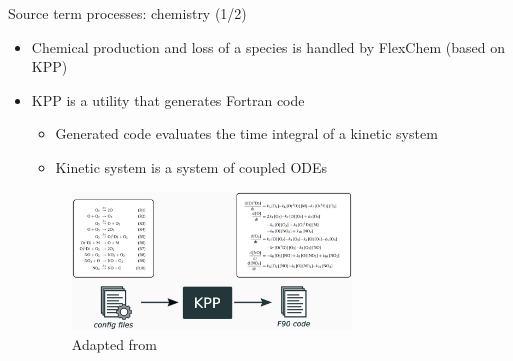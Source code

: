 \documentclass[10pt]{beamer}
\begin{document}
\begin{frame}[fragile]{Source term processes: chemistry (1/2)}
    \begin{itemize}
        \item Chemical production and loss of a species is handled by FlexChem (based on KPP)
        \item KPP is a utility that generates Fortran code 
        \begin{itemize}
            \item Generated code evaluates the time integral of a kinetic system
            \item Kinetic system is a system of coupled ODEs
        \end{itemize}
        \vfill
        \begin{figure}
            \centering
            \includegraphics[width=0.7\textwidth]{kpp.eps}
            \captionsetup{labelformat=empty}
            \caption{Adapted from \cite{sandu_technical_2006}}
        \end{figure}
    \end{itemize}
\end{frame}
\end{document}
